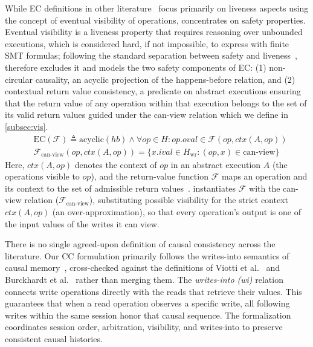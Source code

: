  While EC definitions in other literature~\cite{terry1994session,
  eventual, viotti2016consistency}
  focus primarily on liveness aspects using the concept of
  eventual visibility of operations,
  \sysname{} concentrates on safety properties. Eventual visibility is a
  liveness property that requires reasoning over unbounded executions, which is
  considered hard, if not impossible, to express with finite SMT
  formulas; following the standard separation between
  safety and liveness~\cite{burckhardt2014principles}, \sysname{} therefore
  excludes it and models the two safety components of EC:
  (1) non-circular causality, an acyclic projection of the happens-before
  relation,
  and (2) contextual return value consistency, a predicate on abstract
  executions ensuring that the return value of any operation within
  that execution belongs to the set of its valid return values
  guided under the can-view relation which we define in \cref{subsec:vis}.
  \begin{align*}
    &\text{EC}(\mathcal{F}) \triangleq \text{acyclic}(hb) \land \forall
    op \in H: op.oval \in \mathcal{F}(op, ctx(A, op)) \\
    &\mathcal{F}_{\text{can-view}}(op, ctx(A, op)) = \{x.ival \in
    H_\text{wr} : (op, x) \in \text{can-view}\}
  \end{align*}
  Here, $ctx(A, op)$ denotes the context of $op$ in an abstract execution $A$
  (the operations visible to $op$), and the return-value function $\mathcal{F}$
  maps an operation and its context to the set of admissible return
  values~\cite{burckhardt2014principles, viotti2016consistency}. \sysname{}
  instantiates $\mathcal{F}$ with the can-view relation
  ($\mathcal{F}_{\text{can-view}}$), substituting possible visibility for the
  strict context $ctx(A, op)$ (an over-approximation), so that
  every operation's output is one of the input values of the writes it can view.

  There is no single agreed-upon definition of causal consistency across the
  literature. Our CC formulation primarily follows the writes-into semantics of
  causal memory~\cite{baldoni2002an}, cross-checked against the definitions of
  Viotti et al.~\cite{viotti2016consistency} and Burckhardt et
  al.~\cite{burckhardt2014principles} rather than merging them. The
  \textit{writes-into (wi)}
  relation~\cite{baldoni2002an} connects write operations directly with the
  reads that retrieve their values. This guarantees that when
  a read operation observes a specific write, all following writes
  within the same session honor that causal sequence. The formalization
  coordinates session order, arbitration, visibility, and writes-into to
  preserve consistent causal histories.

